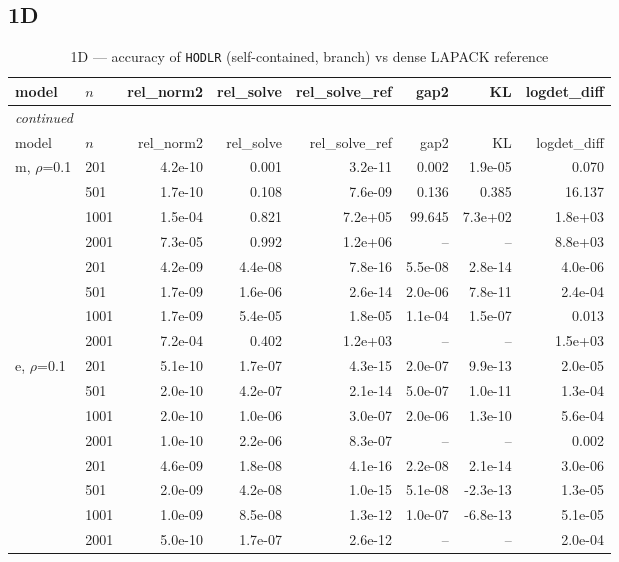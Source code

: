 \documentclass[11pt,a4paper]{article}
\begin{document}
\subsection{1D}
\small\begin{center}
\begin{longtable}{llrrrrrr}
\caption{1D --- accuracy of \texttt{HODLR} (self-contained, branch) vs dense LAPACK reference}
\\\toprule
model & $n$ & rel\_norm2 & rel\_solve & rel\_solve\_ref & gap2 & KL & logdet\_diff\\
\midrule
\endfirsthead
\multicolumn{8}{l}{\small\emph{continued}}\\
\toprule
model & $n$ & rel\_norm2 & rel\_solve & rel\_solve\_ref & gap2 & KL & logdet\_diff\\
\midrule
\endhead

m, $\rho$=0.1 & 201 & 4.2e-10 & 0.001 & 3.2e-11 & 0.002 & 1.9e-05 & 0.070\\
 & 501 & 1.7e-10 & 0.108 & 7.6e-09 & 0.136 & 0.385 & 16.137\\
 & 1001 & 1.5e-04 & 0.821 & 7.2e+05 & 99.645 & 7.3e+02 & 1.8e+03\\
 & 2001 & 7.3e-05 & 0.992 & 1.2e+06 & -- & -- & 8.8e+03\\
 & 201 & 4.2e-09 & 4.4e-08 & 7.8e-16 & 5.5e-08 & 2.8e-14 & 4.0e-06\\
 & 501 & 1.7e-09 & 1.6e-06 & 2.6e-14 & 2.0e-06 & 7.8e-11 & 2.4e-04\\
 & 1001 & 1.7e-09 & 5.4e-05 & 1.8e-05 & 1.1e-04 & 1.5e-07 & 0.013\\
 & 2001 & 7.2e-04 & 0.402 & 1.2e+03 & -- & -- & 1.5e+03\\
e, $\rho$=0.1 & 201 & 5.1e-10 & 1.7e-07 & 4.3e-15 & 2.0e-07 & 9.9e-13 & 2.0e-05\\
 & 501 & 2.0e-10 & 4.2e-07 & 2.1e-14 & 5.0e-07 & 1.0e-11 & 1.3e-04\\
 & 1001 & 2.0e-10 & 1.0e-06 & 3.0e-07 & 2.0e-06 & 1.3e-10 & 5.6e-04\\
 & 2001 & 1.0e-10 & 2.2e-06 & 8.3e-07 & -- & -- & 0.002\\
 & 201 & 4.6e-09 & 1.8e-08 & 4.1e-16 & 2.2e-08 & 2.1e-14 & 3.0e-06\\
 & 501 & 2.0e-09 & 4.2e-08 & 1.0e-15 & 5.1e-08 & -2.3e-13 & 1.3e-05\\
 & 1001 & 1.0e-09 & 8.5e-08 & 1.3e-12 & 1.0e-07 & -6.8e-13 & 5.1e-05\\
 & 2001 & 5.0e-10 & 1.7e-07 & 2.6e-12 & -- & -- & 2.0e-04\\
\bottomrule\end{longtable}\end{center}
\end{document}
